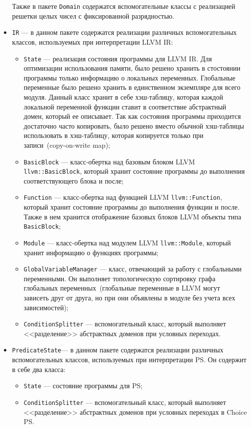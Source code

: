 \begin{itemize}
    Также в пакете \texttt{Domain} содержатся вспомогательные классы с 
    реализацией решетки целых чисел с фиксированной разрядностью.

\item \texttt{IR} --- в данном пакете содержатся реализации различных 
вспомогательных классов, используемых при интерпретации LLVM IR:
    \begin{itemize}
    \item \texttt{State} --- реализация состояния программы для LLVM IR. Для 
    оптимизации использования памяти, было решено хранить в стостоянии 
    программы только информацию о локальных переменных. Глобальные переменные 
    было решено хранить в единственном экземпляре для всего модуля. Данный 
    класс хранит в себе хэш-таблицу, которая каждой локальной переменной 
    функции ставит в соответствие абстрактный домен, который ее описывает. Так 
    как состояния программы приходится достаточно часто копировать, было решено 
    вместо обычной хэш-таблицы использовать в хэш-таблицу, которая копируется 
    только при записи~(copy-on-write map);
    \item \texttt{BasicBlock} --- класс-обертка над базовым блоком LLVM
    \texttt{llvm::BasicBlock}, который хранит состояние программы до
    выполнения соответствующего блока и после;
    \item \texttt{Function} --- класс-обертка над функцией LLVM
    \texttt{llvm::Function}, который хранит состояние программы до 
    выполнения функции и после. Также в нем хранится отображение базовых блоков
    LLVM объекты типа \texttt{BasicBlock};
    \item \texttt{Module} --- класс-обертка над модулем LLVM
    \texttt{llvm::Module}, который хранит информацию о функциях 
    программы;
    \item \texttt{GlobalVariableManager} --- класс, отвечающий за работу с 
    глобальными переменными. Он выполняет топологическую сортировку графа
    глобальных переменных~(глобальные переменные в LLVM могут зависеть друг от
    друга, но при они объявлены в модуле без учета всех зависимостей);
    \item \texttt{ConditionSplitter} --- вспомогательный класс, который 
    выполняет <<разделение>> абстрактных доменов при условных переходах.
    \end{itemize}
\item \texttt{PredicateState}--- в данном пакете содержатся реализации 
различных вспомогательных классов, используемых при интерпретации PS. Он 
содержит в себе два класса:
    \begin{itemize}
    \item \texttt{State} --- состояние программы для PS;
    \item \texttt{ConditionSplitter} --- вспомогательный класс, который 
    выполняет <<разделение>> абстрактных доменов при условных переходах в 
    Choice PS.
    \end{itemize}
\end{itemize}

